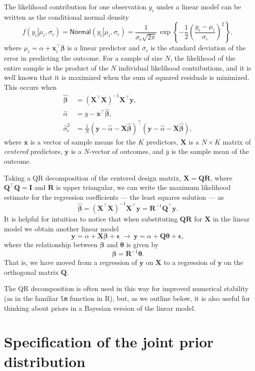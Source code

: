 \documentclass[11pt]{article}
\newcommand{\boldbeta}{\boldsymbol{\beta}}
\newcommand{\boldtheta}{\boldsymbol{\theta}}
\newcommand{\boldeps}{\boldsymbol{\epsilon}}
\newcommand{\hatbeta}{\widehat{\boldbeta}}
\newcommand{\hatalpha}{\widehat{\alpha}}
\newcommand{\sigmaEps}{\sigma_{\epsilon}}
\newcommand{\X}{\mathbf{X}}
\newcommand{\y}{\mathbf{y}}
\newcommand{\Q}{\mathbf{Q}}
\newcommand{\R}{\mathbf{R}}
\newcommand{\given}{\left.\right|}
\begin{document}
The likelihood contribution for one observation $y_i$ under a linear model
can be written as the conditional normal density
%
$$
f \left(y_i \given \mu_i, \sigmaEps \right) =
\mathsf{Normal}\left(y_i \given \mu_i, \sigmaEps \right) =
\frac{1}{\sigmaEps \sqrt{2 \pi}} \,
\exp{\left\{-\frac{1}{2} \left(\frac{y_i - \mu_i}{\sigmaEps}\right)^2\right\}},
$$
%
where $\mu_i = \alpha + \mathbf{x}_i^\top \boldbeta$ is a linear predictor and
$\sigmaEps$ is the standard deviation of the error in predicting the outcome.
For a sample of size $N$, the likelihood of the entire sample is the product of
the $N$ individual likelihood contributions, and it is well known that it is
maximized when the sum of squared residuals is minimized. This occurs when
%
\begin{align*}
\hatbeta &= \left(\X^\top \X \right)^{-1} \X^\top \y,\\
\hatalpha &= \overline{y} - \overline{\mathbf{x}}^\top \hatbeta,\\
\widehat{\sigma}_{\epsilon}^2 &=
  \frac{1}{N}
  \left(\y - \hatalpha - \X \hatbeta \right)^\top
  \left(\y - \hatalpha - \X \hatbeta \right),
\end{align*}
%
where $\overline{\mathbf{x}}$ is a vector of sample means for the
$K$ predictors, $\X$ is a $N \times K$ matrix of \emph{centered} predictors,
$\y$ is a $N$-vector of outcomes, and $\overline{y}$ is the sample mean of the
outcome.

Taking a QR decomposition of the centered design matrix, $\X = \Q\R$, where
$\Q^\top \Q = \mathbf{I}$ and $\R$ is upper triangular, we can write the maximum
likelihood estimate for the regression coefficients --- the least squares
solution --- as
%
$$\hatbeta = \left(\X^\top \X \right)^{-1} \X^\top \y = \R^{-1} \Q^\top \y.$$
%
It is helpful for intuition to notice that when substituting $\Q\R$ for $\X$
in the linear model we obtain another linear model
%
$$\y = \alpha + \X\boldbeta + \boldeps
  \: \longrightarrow \:
  \y = \alpha + \Q\boldtheta + \boldeps,
$$
%
where the relationship between $\boldbeta$ and $\boldtheta$ is given by
%
$$\boldbeta = \R^{-1}\boldtheta.$$
%
That is, we have moved from a regression of $\y$ on $\X$ to a regression of
$\y$ on the orthogonal matrix $\Q$.

The QR decomposition is often used in this way for improved numerical stability
(as in the familiar {\tt lm} function in R), but, as we outline below, it is
also useful for thinking about priors in a Bayesian version of the linear model.


\section{Specification of the joint prior distribution}
\label{sec:priors}
\end{document}
